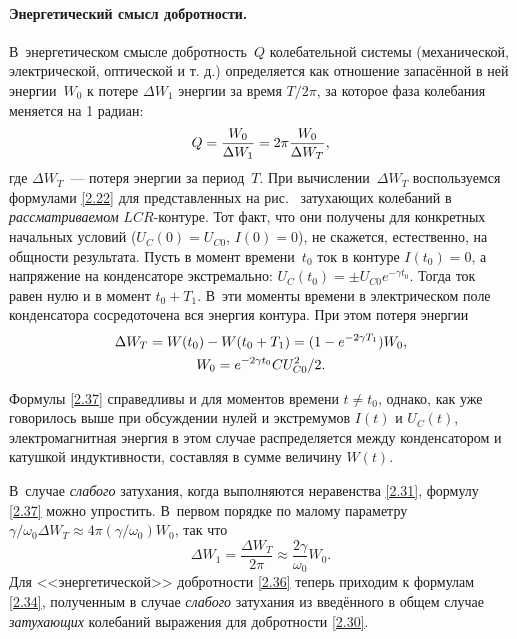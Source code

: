 \paragraph{Энергетический смысл добротности.}
В~энергетическом смысле добротность~$Q$ колебательной системы
(механической, электрической, оптической и т. д.) определяется как отношение
запасённой в ней энергии~$W_0$ к потере $\Delta W_1$ энергии за время $T/2\pi$, за
которое фаза колебания меняется на 1 радиан:
\begin{equation}\eqmark{2.36}
Q=\dfrac{W_0}{\Delta W_1}=2\pi\dfrac{W_0}{\Delta W_T},
\end{equation}
где  $\Delta W_T$~--- потеря энергии за период~$T$.
При вычислении~$\Delta W_T$
воспользуемся формулами \eqref{2.22} для представленных на рис.~
затухающих колебаний в \emph{рассматриваемом} $LCR$-контуре. Тот факт, что
они получены для конкретных начальных условий ($U_C(0)=U_{C0}$, $I(0)=0$),
не скажется, естественно, на общности результата. Пусть в момент времени~$t_0$ ток
в контуре $I(t_0)=0$, а напряжение на конденсаторе экстремально: $U_C(t_0)=\pm
U_{C0}e^{-\gamma t_0}$. Тогда ток равен нулю и в момент $t_0+T_1$. В~эти моменты
времени в электрическом поле конденсатора сосредоточена вся энергия контура. При
этом потеря энергии
\begin{equation}
	\eqmark{2.37}
		\begin{gathered}[c]
			 \Delta W_T = W(t_0)-W(t_0+T_1)=(1-e^{-2\gamma T_1})W_0, \\
			 W_0 = e^{-2\gamma t_0}CU_{C0}^2/2.
		\end{gathered}
\end{equation}

Формулы \eqref{2.37} справедливы и для моментов времени $t\ne t_0$, однако, как
уже говорилось выше при обсуждении нулей и экстремумов $I(t)$ и $U_C(t)$,
электромагнитная энергия в этом случае распределяется между конденсатором и
катушкой индуктивности, составляя в сумме величину $W(t)$.

В~случае \emph{слабого} затухания, когда выполняются неравенства
\eqref{2.31}, формулу \eqref{2.37} можно упростить. В~первом порядке по малому
параметру $\gamma/\omega_0 \Delta W_T\approx 4\pi(\gamma/\omega_0)W_0$, так что
\[
\Delta W_1=\frac{\Delta W_T}{2\pi}\approx \frac{2\gamma}{\omega_0}W_0.
\]
Для <<энергетической>>
добротности \eqref{2.36} теперь приходим к формулам \eqref{2.34}, полученным в
случае \emph{слабого} затухания из введённого в общем случае
\emph{затухающих} колебаний выражения для добротности \eqref{2.30}.

